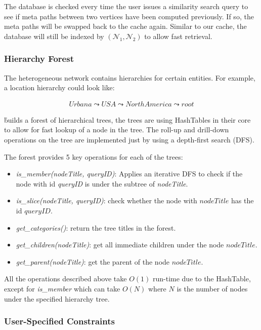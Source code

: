 The database is checked every time the user issues a similarity search query to
see if meta paths between two vertices have been computed previously. If so, the
meta paths will be swapped back to the cache again. Similar to our cache, the
database will still be indexed by $(\mathcal{N}_1, \mathcal{N}_2)$ to allow
fast retrieval.

\subsubsection{Hierarchy Forest}
\label{sec:hier_forest}

The heterogeneous network contains hierarchies for certain entities. For example,
a location hierarchy could look like:

\begin{align*}
Urbana \leadsto USA \leadsto North America \leadsto root
\end{align*}

\h builds a forest of hierarchical trees, the trees are using HashTables in their core to
allow for fast lookup of a node in the tree. The roll-up and drill-down operations
on the tree are implemented just by using a depth-first search (DFS).

The forest provides 5 key operations for each of the trees:
\begin{itemize}
    \item \textit{is\_member(nodeTitle, queryID)}: Applies an iterative DFS to check if
    the node with id \textit{queryID} is under the subtree of \textit{nodeTitle}.
    \item \textit{is\_slice(nodeTitle, queryID)}: check whether the node with $nodeTitle$
    has the id $queryID$.
    \item \textit{get\_categories()}: return the tree titles in the forest.
    \item \textit{get\_children(nodeTitle)}: get all immediate children under the node
    $nodeTitle$.
    \item \textit{get\_parent(nodeTitle)}: get the parent of the node $nodeTitle$.
\end{itemize}

All the operations described above take $O(1)$ run-time due to the HashTable, except for
\textit{is\_member} which can take $O(N)$ where $N$ is the number of nodes under the specified
hierarchy tree.

\subsubsection{User-Specified Constraints}
\label{sec:user_constraint}

